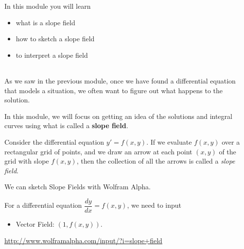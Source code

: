 In this module you will learn
\begin{itemize}
	\item what is a slope field
	\item how to sketch a slope field
	\item to interpret a slope field
\end{itemize}

\hfill \\

As we saw in the previous module, once we have found a differential equation that models a situation, we often want to figure out what happens to the solution.

In this module, we will focus on getting an idea of the solutions and integral curves using what is called a \textbf{slope field}.





\begin{definition} Consider the differential equation $y' = f(x,y)$.
If we evaluate $f(x,y)$ over a rectangular grid of points, and we draw an arrow at each point $(x,y)$ of the grid with slope $f(x,y)$, then the collection of all the arrows is called a \emph{slope field}.
\end{definition}

\begin{graybox}
	
We can sketch Slope Fields with Wolfram Alpha.

For a differential equation $\dfrac{dy}{dx} = f(x,y)$, we need to input
\begin{itemize}
	\item Vector Field: $(1, f(x,y))$.
\end{itemize}

\url{http://www.wolframalpha.com/input/?i=slope+field}
\hfill {}	
\end{graybox}





